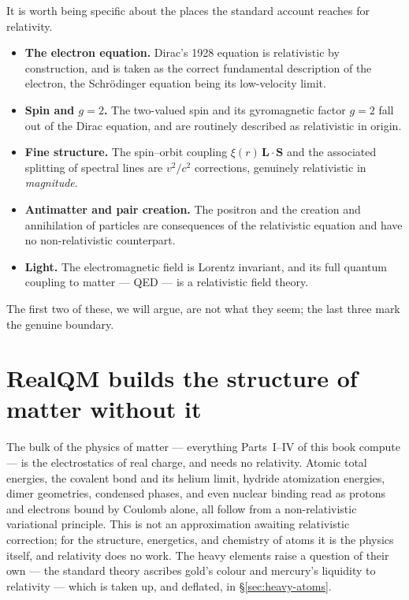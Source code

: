 It is worth being specific about the places the standard account reaches for relativity.
\begin{itemize}
\item \textbf{The electron equation.} Dirac's 1928 equation is relativistic by construction, and is taken as the
correct fundamental description of the electron, the Schr\"odinger equation being its low-velocity limit.
\item \textbf{Spin and $g=2$.} The two-valued spin and its gyromagnetic factor $g=2$ fall out of the Dirac
equation, and are routinely described as relativistic in origin.
\item \textbf{Fine structure.} The spin--orbit coupling $\xi(r)\,\mathbf L\!\cdot\!\mathbf S$ and the associated
splitting of spectral lines are $v^2/c^2$ corrections, genuinely relativistic in \emph{magnitude}.
\item \textbf{Antimatter and pair creation.} The positron and the creation and annihilation of particles are
consequences of the relativistic equation and have no non-relativistic counterpart.
\item \textbf{Light.} The electromagnetic field is Lorentz invariant, and its full quantum coupling to matter ---
QED --- is a relativistic field theory.
\end{itemize}
The first two of these, we will argue, are not what they seem; the last three mark the genuine boundary.

\section{RealQM builds the structure of matter without it}\label{sec:without-relativity}

The bulk of the physics of matter --- everything Parts~I--IV of this book compute --- is the electrostatics of
real charge, and needs no relativity. Atomic total energies, the covalent bond and its helium limit, hydride
atomization energies, dimer geometries, condensed phases, and even nuclear binding read as protons and electrons
bound by Coulomb alone, all follow from a non-relativistic variational principle. This is not an approximation
awaiting relativistic correction; for the structure, energetics, and chemistry of atoms it is the physics itself,
and relativity does no work. The heavy elements raise a question of their own --- the standard theory ascribes
gold's colour and mercury's liquidity to relativity --- which is taken up, and deflated, in
\S\ref{sec:heavy-atoms}.

